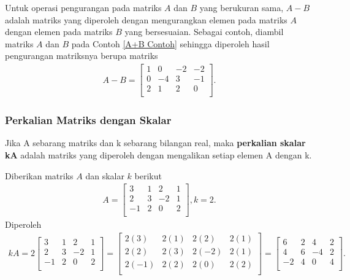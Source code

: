 Untuk operasi pengurangan pada matriks $A$ dan $B$ yang berukuran sama, $A-B$ adalah matriks yang diperoleh dengan mengurangkan elemen pada matriks $A$ dengan elemen pada matriks $B$ yang bersesuaian. Sebagai contoh, diambil matriks $A$ dan $B$ pada Contoh \ref{A+B Contoh} sehingga diperoleh hasil pengurangan matriksnya berupa matriks
\begin{gather*}
    A-B=
    \begin{bmatrix}
        1 & 0 & -2 & -2\\
        0 & -4 & 3 & -1\\
        2 & 1 & 2 & 0\\
    \end{bmatrix}.
\end{gather*}


\subsubsection{Perkalian Matriks dengan Skalar}
\begin{definisi}
    Jika A sebarang matriks dan k sebarang bilangan real, maka\textbf{ perkalian skalar kA} adalah matriks yang diperoleh dengan mengalikan setiap elemen A dengan k.
\end{definisi}
\begin{contoh}
Diberikan matriks $A$ dan skalar $k$ berikut
\begin{gather*} 
        A=
        \begin{bmatrix}
        3 & 1 & 2 & 1\\
        2 & 3 & -2 & 1\\
        -1 & 2 & 0 & 2\\
        \end{bmatrix}
        ,k=2.
        \end{gather*}
        Diperoleh
        \begin{gather*}
        kA=2\begin{bmatrix}
        3 & 1 & 2 & 1\\
        2 & 3 & -2 & 1\\
        -1 & 2 & 0 & 2\\
        \end{bmatrix}=
        \begin{bmatrix}
        2(3) & 2(1) & 2(2) & 2(1)\\
        2(2) & 2(3) & 2(-2) & 2(1)\\
        2(-1) & 2(2) & 2(0) & 2(2)\\
        \end{bmatrix}=
        \begin{bmatrix}
        6 & 2 & 4 & 2\\
        4 & 6 & -4 & 2\\
        -2 & 4 & 0 & 4\\
        \end{bmatrix}.
\end{gather*}

\end{contoh}

